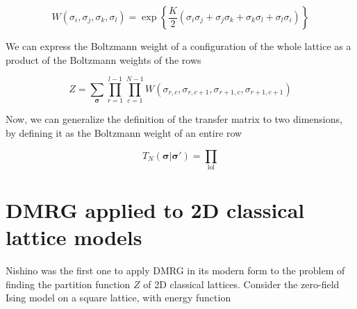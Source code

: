 \begin{equation}
  W(\sigma_i, \sigma_j, \sigma_k, \sigma_l) = \exp \left\{ \frac{K}{2} (\sigma_i \sigma_j + \sigma_j \sigma_k + \sigma_k \sigma_l + \sigma_l \sigma_i) \right\}
\end{equation}

We can express the Boltzmann weight of a configuration of the whole lattice as a product of the Boltzmann weights of the rows

\begin{equation}
  Z = \sum_{\bm{\sigma}} \prod_{r = 1}^{l - 1} \prod_{c = 1}^{N - 1} W(\sigma_{r, c}, \sigma_{r, c + 1}, \sigma_{r + 1, c}, \sigma_{r + 1, c + 1})
\end{equation}

Now, we can generalize the definition of the transfer matrix to two dimensions, by defining it as the Boltzmann weight of an entire row

\begin{equation} 
  T_{N}(\bm{\sigma} | \bm{\sigma'}) = \prod_{\text{lol}}
\end{equation}









\section{DMRG applied to 2D classical lattice models}






Nishino \cite{nishino1995density} was the first one to apply DMRG in its modern
form to the problem of finding the partition function $Z$ of 2D classical
lattices. Consider the zero-field Ising model on a square lattice, with energy function

